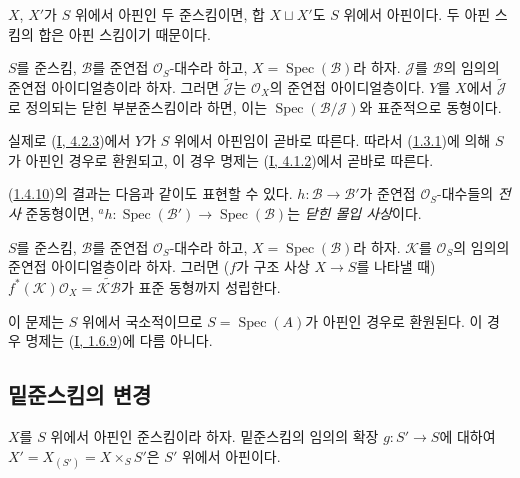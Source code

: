 \begin{env}[1.4.9]
\label{II.1.4.9-ko}
$X$, $X'$가 $S$ 위에서 아핀인 두 준스킴이면, 합
$X\sqcup X'$도 $S$ 위에서 아핀이다. 두 아핀 스킴의 합은 아핀
스킴이기 때문이다.
\end{env}

\begin{env}[1.4.10]
\label{II.1.4.10-ko}
$S$를 준스킴, $\mathcal{B}$를 준연접 $\mathcal{O}_S$-대수라 하고,
$X=\operatorname{Spec}(\mathcal{B})$라 하자. $\mathcal{J}$를
$\mathcal{B}$의 임의의 준연접 아이디얼층이라 하자. 그러면
$\widetilde{\mathcal{J}}$는 $\mathcal{O}_X$의 준연접 아이디얼층이다.
$Y$를 $X$에서 $\widetilde{\mathcal{J}}$로 정의되는 닫힌 부분준스킴이라
하면, 이는 $\operatorname{Spec}(\mathcal{B}/\mathcal{J})$와 표준적으로
동형이다.
\end{env}

실제로 (\hyperref[I.4.2.3-ko]{I, 4.2.3})에서 $Y$가 $S$ 위에서
아핀임이 곧바로 따른다. 따라서 (\hyperref[II.1.3.1-ko]{1.3.1})에 의해
$S$가 아핀인 경우로 환원되고, 이 경우 명제는
(\hyperref[I.4.1.2-ko]{I, 4.1.2})에서 곧바로 따른다.

(\hyperref[II.1.4.10-ko]{1.4.10})의 결과는 다음과 같이도 표현할 수
있다. $h:\mathcal{B}\to\mathcal{B}'$가 준연접 $\mathcal{O}_S$-대수들의
\emph{전사} 준동형이면,
${}^a h:\operatorname{Spec}(\mathcal{B}')\to
\operatorname{Spec}(\mathcal{B})$는 \emph{닫힌 몰입 사상}이다.

\begin{env}[1.4.11]
\label{II.1.4.11-ko}
$S$를 준스킴, $\mathcal{B}$를 준연접 $\mathcal{O}_S$-대수라 하고,
$X=\operatorname{Spec}(\mathcal{B})$라 하자. $\mathcal{K}$를
$\mathcal{O}_S$의 임의의 준연접 아이디얼층이라 하자. 그러면
($f$가 구조 사상 $X\to S$를 나타낼 때)
$f^*(\mathcal{K})\mathcal{O}_X=\widetilde{\mathcal{K}\mathcal{B}}$가
표준 동형까지 성립한다.
\end{env}

이 문제는 $S$ 위에서 국소적이므로 $S=\operatorname{Spec}(A)$가 아핀인
경우로 환원된다. 이 경우 명제는
(\hyperref[I.1.6.9-ko]{I, 1.6.9})에 다름 아니다.

\subsection{밑준스킴의 변경}
\label{II.1.5-ko}

\begin{env}[1.5.1]
\label{II.1.5.1-ko}
$X$를 $S$ 위에서 아핀인 준스킴이라 하자. 밑준스킴의 임의의 확장
$g:S'\to S$에 대하여 $X'=X_{(S')}=X\times_S S'$은 $S'$ 위에서
아핀이다.
\end{env}

